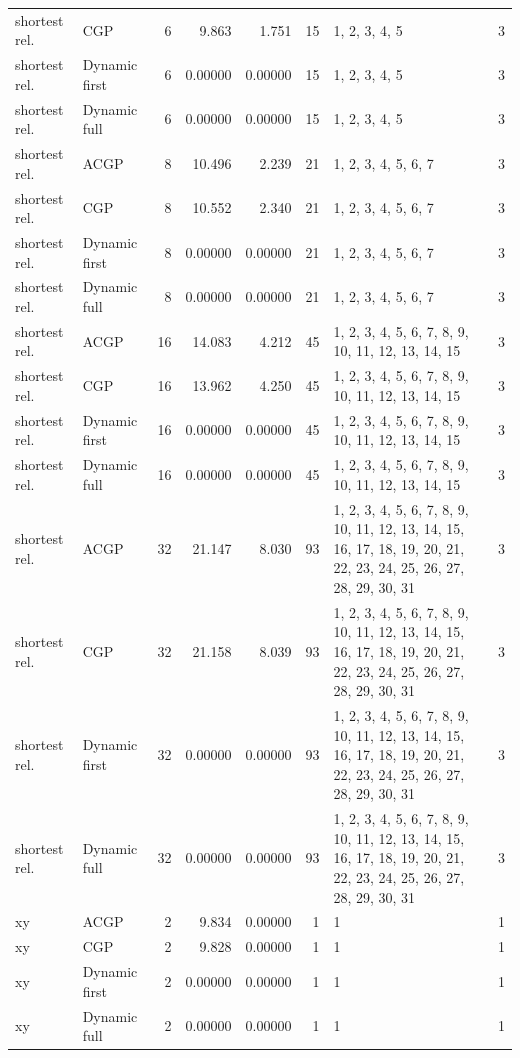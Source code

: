 \documentclass[10pt,a4paper]{article}
\begin{document}
\begin{longtable}{@{}p{23mm}p{29mm}rrrrp{36mm}r@{}}
shortest rel. & CGP & 6 & 9.863 & 1.751 & 15 & 1, 2, 3, 4, 5 & 3 \\
shortest rel. & Dynamic first & 6 & 0.00000 & 0.00000 & 15 & 1, 2, 3, 4, 5 & 3 \\
shortest rel. & Dynamic full & 6 & 0.00000 & 0.00000 & 15 & 1, 2, 3, 4, 5 & 3 \\
shortest rel. & ACGP & 8 & 10.496 & 2.239 & 21 & 1, 2, 3, 4, 5, 6, 7 & 3 \\
shortest rel. & CGP & 8 & 10.552 & 2.340 & 21 & 1, 2, 3, 4, 5, 6, 7 & 3 \\
shortest rel. & Dynamic first & 8 & 0.00000 & 0.00000 & 21 & 1, 2, 3, 4, 5, 6, 7 & 3 \\
shortest rel. & Dynamic full & 8 & 0.00000 & 0.00000 & 21 & 1, 2, 3, 4, 5, 6, 7 & 3 \\
shortest rel. & ACGP & 16 & 14.083 & 4.212 & 45 & 1, 2, 3, 4, 5, 6, 7, 8, 9, 10, 11, 12, 13, 14, 15 & 3 \\
shortest rel. & CGP & 16 & 13.962 & 4.250 & 45 & 1, 2, 3, 4, 5, 6, 7, 8, 9, 10, 11, 12, 13, 14, 15 & 3 \\
shortest rel. & Dynamic first & 16 & 0.00000 & 0.00000 & 45 & 1, 2, 3, 4, 5, 6, 7, 8, 9, 10, 11, 12, 13, 14, 15 & 3 \\
shortest rel. & Dynamic full & 16 & 0.00000 & 0.00000 & 45 & 1, 2, 3, 4, 5, 6, 7, 8, 9, 10, 11, 12, 13, 14, 15 & 3 \\
shortest rel. & ACGP & 32 & 21.147 & 8.030 & 93 & 1, 2, 3, 4, 5, 6, 7, 8, 9, 10, 11, 12, 13, 14, 15, 16, 17, 18, 19, 20, 21, 22, 23, 24, 25, 26, 27, 28, 29, 30, 31 & 3 \\
shortest rel. & CGP & 32 & 21.158 & 8.039 & 93 & 1, 2, 3, 4, 5, 6, 7, 8, 9, 10, 11, 12, 13, 14, 15, 16, 17, 18, 19, 20, 21, 22, 23, 24, 25, 26, 27, 28, 29, 30, 31 & 3 \\
shortest rel. & Dynamic first & 32 & 0.00000 & 0.00000 & 93 & 1, 2, 3, 4, 5, 6, 7, 8, 9, 10, 11, 12, 13, 14, 15, 16, 17, 18, 19, 20, 21, 22, 23, 24, 25, 26, 27, 28, 29, 30, 31 & 3 \\
shortest rel. & Dynamic full & 32 & 0.00000 & 0.00000 & 93 & 1, 2, 3, 4, 5, 6, 7, 8, 9, 10, 11, 12, 13, 14, 15, 16, 17, 18, 19, 20, 21, 22, 23, 24, 25, 26, 27, 28, 29, 30, 31 & 3 \\
xy & ACGP & 2 & 9.834 & 0.00000 & 1 & 1 & 1 \\
xy & CGP & 2 & 9.828 & 0.00000 & 1 & 1 & 1 \\
xy & Dynamic first & 2 & 0.00000 & 0.00000 & 1 & 1 & 1 \\
xy & Dynamic full & 2 & 0.00000 & 0.00000 & 1 & 1 & 1 \\

\end{longtable}
\end{document}
